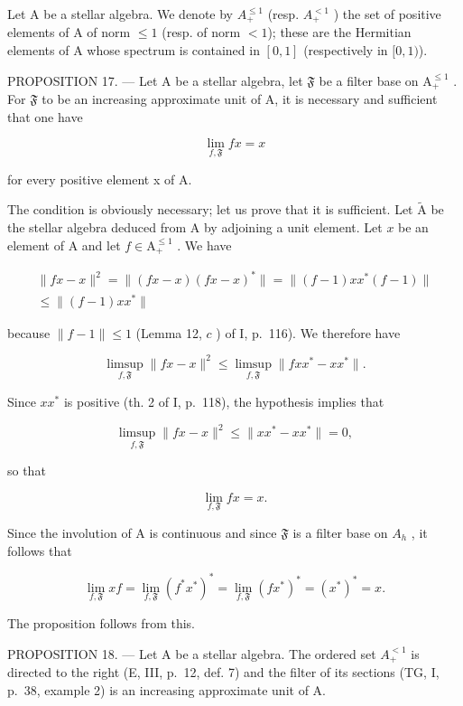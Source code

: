 Let A be a stellar algebra. We denote by \(A_{+}^{\leqslant1}\) (resp. \(A_{+}^{<1}\) ) the set of positive elements of A of norm \(\leqslant 1\) (resp. of norm \(< 1\)); these are the Hermitian elements of A whose spectrum is contained in \([0,1]\) (respectively in \([0,1)\)).

PROPOSITION 17. --- Let A be a stellar algebra, let \(\mathfrak{F}\) be a filter base on \(\mathrm{A}_{+}^{\leqslant 1}\) . For \(\mathfrak{F}\) to be an increasing approximate unit of A, it is necessary and sufficient that one have

\[
\lim _ {f, \mathfrak {F}} f x = x
\]

for every positive element x of A.

The condition is obviously necessary; let us prove that it is sufficient. Let \(\widetilde{\mathrm{A}}\) be the stellar algebra deduced from A by adjoining a unit element. Let \(x\) be an element of A and let \(f \in \mathrm{A}_{+}^{\leqslant 1}\) . We have

\[
\begin{array}{c} \| f x - x \| ^ {2} = \| (f x - x) (f x - x) ^ {*} \| = \| (f - 1) x x ^ {*} (f - 1) \| \\ \leqslant \| (f - 1) x x ^ {*} \| \end{array}
\]

because \(\| f - 1\| \leqslant 1\) (Lemma 12, \(c\) ) of I, p.~116). We therefore have

\[
\limsup _ {f, \mathfrak {F}} \| f x - x \| ^ {2} \leqslant \limsup _ {f, \mathfrak {F}} \| f x x ^ {*} - x x ^ {*} \|.
\]

Since \(xx^{*}\) is positive (th. 2 of I, p.~118), the hypothesis implies that

\[
\limsup _ {f, \mathfrak {F}} \| f x - x \| ^ {2} \leqslant \| x x ^ {*} - x x ^ {*} \| = 0,
\]

so that

\[
\lim _ {f, \mathfrak {F}} f x = x.
\]

Since the involution of A is continuous and since \(\mathfrak{F}\) is a filter base on \(A_{h}\) , it follows that

\[
\lim _ {f, \mathfrak {F}} x f = \lim _ {f, \mathfrak {F}} (f ^ {*} x ^ {*}) ^ {*} = \lim _ {f, \mathfrak {F}} (f x ^ {*}) ^ {*} = (x ^ {*}) ^ {*} = x.
\]

The proposition follows from this.

PROPOSITION 18. --- Let A be a stellar algebra. The ordered set \(A_{+}^{<1}\) is directed to the right (E, III, p.~12, def. 7) and the filter of its sections (TG, I, p.~38, example 2) is an increasing approximate unit of A.

